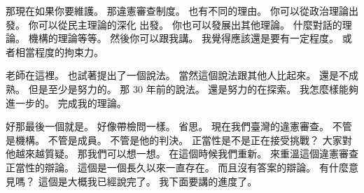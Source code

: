 \hypertarget{w01:cue:470}{}那現在如果你要維護。
\hypertarget{w01:cue:471}{}那違憲審查制度。
\hypertarget{w01:cue:472}{}也有不同的理由。
\hypertarget{w01:cue:473}{}你可以從政治理論出發。
\hypertarget{w01:cue:474}{}你可以從民主理論的深化
\hypertarget{w01:cue:475}{}出發。
\hypertarget{w01:cue:476}{}你也可以發展出其他理論。
\hypertarget{w01:cue:477}{}什麼對話的理論。
\hypertarget{w01:cue:478}{}機構的理論等等。
\hypertarget{w01:cue:479}{}然後你可以跟我講。
\hypertarget{w01:cue:480}{}我覺得應該還是要有一定程度。
\hypertarget{w01:cue:481}{}或者相當程度的拘束力。

\hypertarget{w01:cue:482}{}老師在這裡。
\hypertarget{w01:cue:483}{}也試著提出了一個說法。
\hypertarget{w01:cue:484}{}當然這個說法跟其他人比起來。
\hypertarget{w01:cue:485}{}還是不成熟。
\hypertarget{w01:cue:486}{}但是至少是努力的。
\hypertarget{w01:cue:487}{}那 30 年前的說法。
\hypertarget{w01:cue:488}{}還是努力的在探索。
\hypertarget{w01:cue:489}{}我怎麼樣能夠進一步的。
\hypertarget{w01:cue:490}{}完成我的理論。

\hypertarget{w01:cue:491}{}好那最後一個就是。
\hypertarget{w01:cue:492}{}好像帶檢問一樣。
\hypertarget{w01:cue:493}{}省思。
\hypertarget{w01:cue:494}{}現在我們臺灣的違憲審查。
\hypertarget{w01:cue:495}{}不管是機構。
\hypertarget{w01:cue:496}{}不管是成員。
\hypertarget{w01:cue:497}{}不管是他的判決。
\hypertarget{w01:cue:498}{}正當性是不是正在接受挑戰？
\hypertarget{w01:cue:499}{}大家對他越來越質疑。
\hypertarget{w01:cue:500}{}那我們可以想一想。
\hypertarget{w01:cue:501}{}在這個時候我們重新。
\hypertarget{w01:cue:502}{}來重溫這個違憲審查
\hypertarget{w01:cue:503}{}正當性的辯論。
\hypertarget{w01:cue:504}{}這個是一個長久以來一直存在。
\hypertarget{w01:cue:505}{}而且沒有答案的辯論。
\hypertarget{w01:cue:506}{}有什麼意見嗎？
\hypertarget{w01:cue:507}{}這個是大概我已經說完了。
\hypertarget{w01:cue:508}{}我下面要講的進度了。

